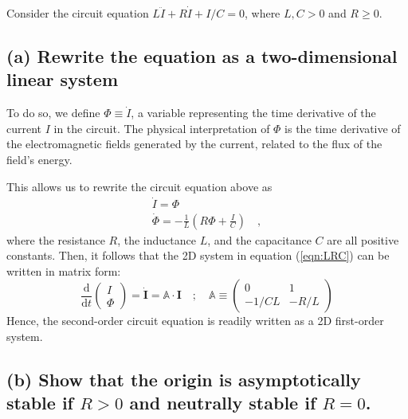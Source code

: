 \documentclass[draft]{agujournal2019}
\begin{document}
Consider the circuit equation $L\ddot I + R \dot I + I/C = 0$, where $L,C>0$ and $R\geq0$.


\subsection{(a) Rewrite the equation as a two-dimensional linear system}
\label{ssec:p3a}

To do so, we define $\Phi \equiv \dot I$, a variable representing the time derivative of the current $I$ in the circuit. The physical interpretation of $\Phi$ is the time derivative of the electromagnetic fields generated by the current, related to the flux of the field's energy. 
\par
This allows us to rewrite the circuit equation above as 
\begin{align}
    \label{eqn:LRC}
    \dot I = \Phi\qquad \qquad \\
    \dot \Phi = -\frac{1}{L} \left(R \Phi + \frac{I}{C} \right ) \quad ,
\end{align}
where the resistance $R$, the inductance $L$, and the capacitance $C$ are all positive constants. Then, it follows that the 2D system in equation (\ref{eqn:LRC}) can be written in matrix form:
\begin{equation*}
    \frac{\mathrm{d}}{\mathrm{d}t} \begin{pmatrix} I \\ \Phi \end{pmatrix}
    = \mathbf{\dot{I}} = \mathbb{A}
    \cdot \mathbf{I} \quad ; \quad  
    \mathbb{A}\equiv  \begin{pmatrix}
        0 & 1 \\
        -1/CL & -R/L
    \end{pmatrix}    
\end{equation*}
Hence, the second-order circuit equation is readily written as a 2D first-order system.
\par

\subsection{(b) Show that the origin is asymptotically stable if $R>0$ and neutrally stable if $R=0$.}
\label{ssec:p3b}
\end{document}
